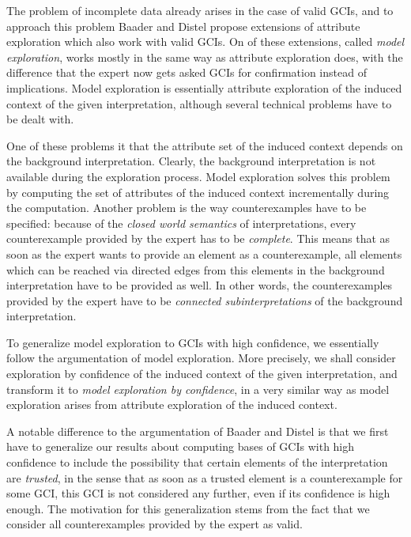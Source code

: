 The problem of incomplete data already arises in the case of valid GCIs, and to approach
this problem Baader and Distel propose extensions of attribute exploration which also work
with valid GCIs.  On of these extensions, called \emph{model exploration}, works mostly in
the same way as attribute exploration does, with the difference that the expert now gets
asked GCIs for confirmation instead of implications.  Model exploration is essentially
attribute exploration of the induced context of the given interpretation, although several
technical problems have to be dealt with.

One of these problems it that the attribute set of the induced context depends on the
background interpretation.  Clearly, the background interpretation is not available during
the exploration process.  Model exploration solves this problem by computing the set of
attributes of the induced context incrementally during the computation.  Another problem
is the way counterexamples have to be specified: because of the \emph{closed world
  semantics} of interpretations, every counterexample provided by the expert has to be
\emph{complete}.  This means that as soon as the expert wants to provide an element as a
counterexample, all elements which can be reached via directed edges from this elements in
the background interpretation have to be provided as well.  In other words, the
counterexamples provided by the expert have to be \emph{connected subinterpretations} of
the background interpretation.

To generalize model exploration to GCIs with high confidence, we essentially follow the
argumentation of model exploration.  More precisely, we shall consider exploration by
confidence of the induced context of the given interpretation, and transform it to
\emph{model exploration by confidence}, in a very similar way as model exploration arises
from attribute exploration of the induced context.

A notable difference to the argumentation of Baader and Distel is that we first have to
generalize our results about computing bases of GCIs with high confidence to include the
possibility that certain elements of the interpretation are \emph{trusted}, in the sense
that as soon as a trusted element is a counterexample for some GCI, this GCI is not
considered any further, even if its confidence is high enough.  The motivation for this
generalization stems from the fact that we consider all counterexamples provided by the
expert as valid.


